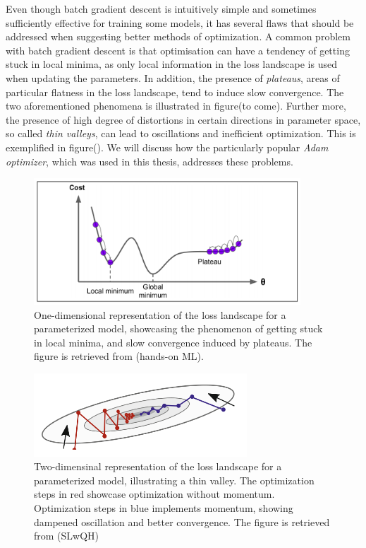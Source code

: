 Even though batch gradient descent is intuitively simple and sometimes sufficiently effective for training some models, it has several flaws that should be addressed when suggesting better methods of optimization. A common problem with batch gradient descent is that optimisation can have a tendency of getting stuck in local minima, as only local information in the loss landscape is used when updating the parameters. In addition, the presence of \emph{plateaus}, areas of particular flatness in the loss landscape, tend to induce slow convergence. The two aforementioned phenomena is illustrated in figure(to come). Further more, the presence of high degree of distortions in certain directions in parameter space, so called  \emph{thin valleys}, can lead to oscillations and inefficient optimization. This is exemplified in figure(). We will discuss how the particularly popular \emph{Adam optimizer}, which was used in this thesis, addresses these problems. 


\begin{figure}[htp]
    \centering
    \includegraphics[width=10cm]{latex/figures/local_minimum_saddle_point.png}
    \caption{One-dimensional representation of the loss landscape for a parameterized model, showcasing the phenomenon of getting stuck in local minima, and slow convergence induced by plateaus. The figure is retrieved from (hands-on ML).}
    \label{fig:localMinima}
\end{figure}

\begin{figure}[htp]
    \centering
    \includegraphics[width=8cm]{latex/figures/thin_vally.png}
    \caption{Two-dimensinal representation of the loss landscape for a parameterized model, illustrating a thin valley. The optimization steps in red showcase optimization without momentum. Optimization steps in blue implements momentum, showing dampened oscillation and better convergence. The figure is retrieved from (SLwQH)}
    \label{fig:thinValley}
\end{figure}

